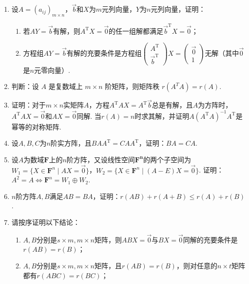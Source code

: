 \begin{enumerate}
    \item 设$A=(a_{ij})_{m\times n}$，$\vec{b}$和$X$为$m$元列向量，$Y$为$n$元列向量，证明：
          \begin{enumerate}
              \item 若$AY=\vec{b}$有解，则$A^\mathrm{T}X=\vec{0}$的任一组解都满足$\vec{b}^\mathrm{T}X=\vec{0}$；

              \item 方程组$AY=\vec{b}$有解的充要条件是方程组$\begin{pmatrix}
                            A^\mathrm{T} \\ \vec{b}^\mathrm{T}
                        \end{pmatrix}X=\begin{pmatrix}
                            \vec{0} \\ 1
                        \end{pmatrix}$无解（其中$\vec{0}$是$n$元零向量）.
          \end{enumerate}

    \item 判断：设 $A$ 是复数域上 $m \times n$ 阶矩阵，则矩阵秩 $r\left(A^T A\right)=r(A)$.

    \item 证明：对于$m \times n$实矩阵$A$，方程$A^\mathrm{T}AX = A^\mathrm{T}\vec{b}$总是有解，且$A$为方阵时，$A^\mathrm{T}AX = \vec{0}$和$AX=\vec{0}$同解. 当$r(A)=n$时求其解，并证明$A(A^\mathrm{T}A)^{-1}A^\mathrm{T}$是幂等的对称矩阵.

    \item 设$A,B,C$为$n$阶实方阵，且$BAA^\mathrm{T}=CAA^\mathrm{T}$，证明：$BA=CA$.

    \item 设$A$为数域$\mathbf{F}$上的$n$阶方阵，又设线性空间$\mathbf{F^n}$的两个子空间为$W_1=\{X\in\mathbf{F}^n \mid AX=\vec{0}\}$，$W_2=\{X\in\mathbf{F}^n \mid (A-E)X=\vec{0}\}$. 证明：$A^2=A \iff \mathbf{F}^n=W_1\oplus W_2$.

    \item $n$阶方阵$A,B$满足$AB=BA$，证明：$r(AB)+r(A+B) \leqslant r(A)+r(B)$.

    \item 请按序证明以下结论：
          \begin{enumerate}
              \item $A,B$分别是$s \times m,m \times n$矩阵，则$ABX=\vec{0}$与$BX=\vec{0}$同解的充要条件是$r(AB)=r(B)$；

              \item $A,B$分别是$s \times m,m \times n$矩阵，且$r(AB)=r(B)$，则对任意的$n \times t$矩阵都有$r(ABC)=r(BC)$；


\end{enumerate}
\end{enumerate}
